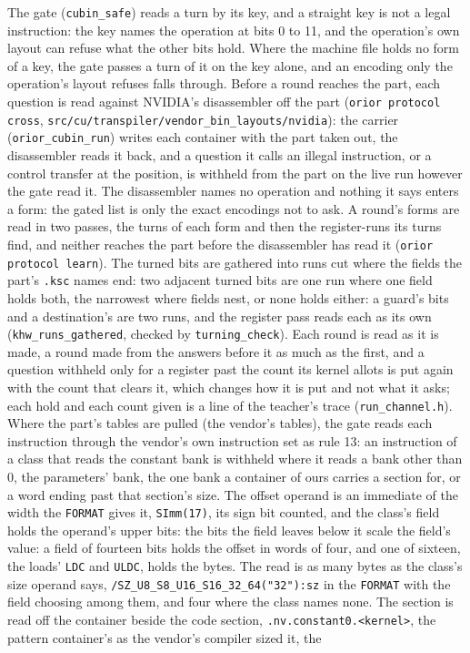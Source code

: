 The gate (\texttt{cubin\_\allowbreak{}safe}) reads a turn by its key, and a straight key is not a legal instruction: the key names the operation at bits 0 to 11, and the operation's own layout can refuse what the other bits hold. Where the machine file holds no form of a key, the gate passes a turn of it on the key alone, and an encoding only the operation's layout refuses falls through. Before a round reaches the part, each question is read against NVIDIA's disassembler off the part (\texttt{orior protocol cross}, \texttt{src/\allowbreak{}cu/\allowbreak{}transpiler/\allowbreak{}vendor\_\allowbreak{}bin\_\allowbreak{}layouts/\allowbreak{}nvidia}): the carrier (\texttt{orior\_\allowbreak{}cubin\_\allowbreak{}run}) writes each container with the part taken out, the disassembler reads it back, and a question it calls an illegal instruction, or a control transfer at the position, is withheld from the part on the live run however the gate read it. The disassembler names no operation and nothing it says enters a form: the gated list is only the exact encodings not to ask. A round's forms are read in two passes, the turns of each form and then the register-runs its turns find, and neither reaches the part before the disassembler has read it (\texttt{orior protocol learn}). The turned bits are gathered into runs cut where the fields the part's \texttt{.\allowbreak{}ksc} names end: two adjacent turned bits are one run where one field holds both, the narrowest where fields nest, or none holds either: a guard's bits and a destination's are two runs, and the register pass reads each as its own (\texttt{khw\_\allowbreak{}runs\_\allowbreak{}gathered}, checked by \texttt{turning\_\allowbreak{}check}). Each round is read as it is made, a round made from the answers before it as much as the first, and a question withheld only for a register past the count its kernel allots is put again with the count that clears it, which changes how it is put and not what it asks; each hold and each count given is a line of the teacher's trace (\texttt{run\_\allowbreak{}channel.\allowbreak{}h}). Where the part's tables are pulled (the vendor's tables), the gate reads each instruction through the vendor's own instruction set as rule 13: an instruction of a class that reads the constant bank is withheld where it reads a bank other than 0, the parameters' bank, the one bank a container of ours carries a section for, or a word ending past that section's size. The offset operand is an immediate of the width the \texttt{FORMAT} gives it, \texttt{SImm(17)}, its sign bit counted, and the class's field holds the operand's upper bits: the bits the field leaves below it scale the field's value: a field of fourteen bits holds the offset in words of four, and one of sixteen, the loads' \texttt{LDC} and \texttt{ULDC}, holds the bytes. The read is as many bytes as the class's size operand says, \texttt{/\allowbreak{}SZ\_\allowbreak{}U8\_\allowbreak{}S8\_\allowbreak{}U16\_\allowbreak{}S16\_\allowbreak{}32\_\allowbreak{}64("32"):sz} in the \texttt{FORMAT} with the field choosing among them, and four where the class names none. The section is read off the container beside the code section, \texttt{.\allowbreak{}nv.\allowbreak{}constant0.\allowbreak{}<kernel>}, the pattern container's as the vendor's compiler sized it, the 